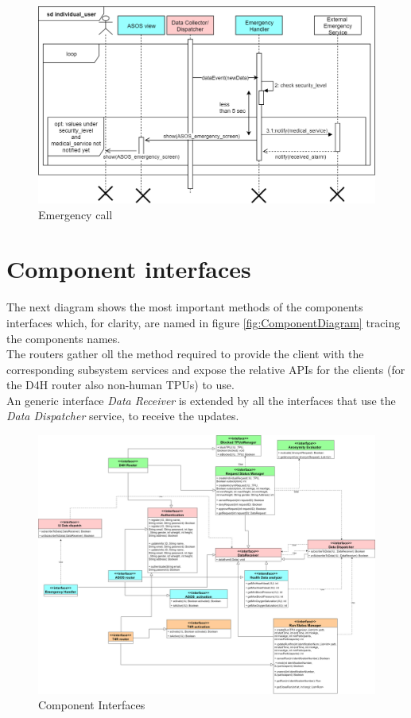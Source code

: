 \begin{figure}[H]
\caption{Emergency call}
\centering
\includegraphics[width = \textwidth]{sections/architecturalDesign/emergencyCall.png}
\end{figure}
\section{Component interfaces}
The next diagram shows the most important methods of the components interfaces which, for clarity, are named in figure \ref{fig:ComponentDiagram} tracing the components names.\\
The routers gather oll the method required to provide the client with the corresponding subsystem services and expose the relative APIs for the clients (for the D4H router also non-human TPUs) to use. \\
An generic interface \textit{Data Receiver} is extended by all the interfaces that use the \textit{Data Dispatcher} service, to receive the updates.
\begin{figure}[H]
\caption{Component Interfaces}
\centering
\includegraphics[width = \textwidth]{sections/architecturalDesign/componentInterfaces.png}
\end{figure}
